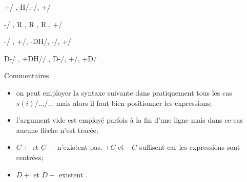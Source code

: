\begin{minipage}{16cm}
\begin{tkzexample}
 {+/  \va  ,-H/\vb,-/\vc, +/  \vd}
\end{tkzexample}
\end{minipage}

\begin{minipage}{16cm}
\begin{tkzexample}
 {-/  \va  , R , R , R , +/  \ve}
\end{tkzexample}
\end{minipage}

\begin{minipage}{16cm}
\begin{tkzexample}
  {-/ \va , +/\vb , -DH/\vc , -/\vd , +/ \ve}
 \end{tkzexample}
\end{minipage} 

\begin{minipage}{16cm}
\begin{tkzexample}
 {D-/ \va , +DH/\vb/ , D-/\vc , +/\vd , +D/\ve}
\end{tkzexample}
\end{minipage}
\egroup

\medskip
Commentaires
\begin{itemize}
  \item on peut employer la syntaxe suivante dans pratiquement tous les cas $s(i)/\ldots/\ldots$ mais alors il faut bien positionner les expressions;
  
  \item l'argument vide est employé parfois à la fin d'une ligne mais dans ce cas aucune flèche n'est tracée;
  
  \item $C+$ et $C-$ n'existent pas. $+C$ et $-C$ suffisent car les expressions sont centrées;
  \item  $D+$ et $D-$ existent .

\end{itemize}


